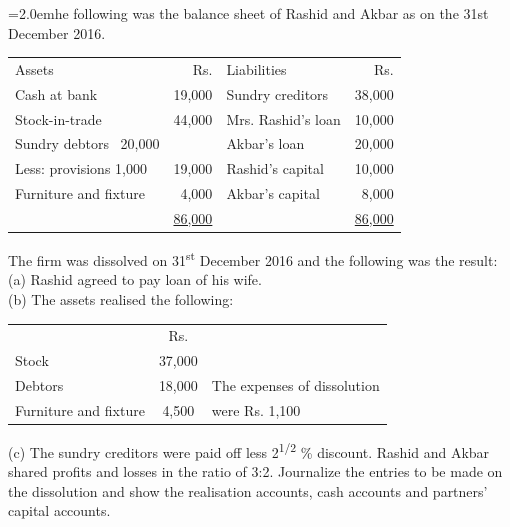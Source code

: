 \documentclass[11pt,a4paper]{article}
\newcommand{\lqn}[2]{\Needspace{6\baselineskip}\par\medskip\noindent\hangindent=2.0em\hangafter=1\makebox[2.0em][l]{\textbf{#1.}}#2\par}
\begin{document}
\lqn{107}{he following was the balance sheet of Rashid and Akbar as on the 31st December 2016.\par
\par\smallskip\noindent\hspace*{1.2em}\begin{tabular}{|lrlr|}
\hline
Assets & Rs. & Liabilities & Rs.\\
Cash at bank & 19,000 & Sundry creditors & 38,000\\
Stock-in-trade & 44,000 & Mrs. Rashid\textquoteright s loan & 10,000\\
Sundry debtors \ 20,000 & & Akbar\textquoteright s loan & 20,000\\
Less: provisions 1,000 & 19,000 & Rashid\textquoteright s capital & 10,000\\
Furniture and fixture & 4,000 & Akbar\textquoteright s capital & 8,000\\
 & \underline{86,000} & & \underline{86,000}\\
\hline
\end{tabular}\par\smallskip
The firm was dissolved on 31\textsuperscript{st}  December 2016 and the following was the result:\\
(a) Rashid agreed to pay loan of his wife.\\
(b) The assets realised the following:\par
\par\smallskip\noindent\hspace*{1.2em}\begin{tabular}{|lcl|}
\hline
 & Rs. &  \\
Stock & 37,000 &  \\
Debtors & 18,000 & The expenses of dissolution \\
Furniture and fixture & 4,500 & were Rs. 1,100 \\
\hline
\end{tabular}\par\smallskip
(c) The sundry creditors were paid off less 2\textsuperscript{1/2}  \% discount. Rashid and Akbar shared profits and losses in the ratio of 3:2. Journalize the entries to be made on the dissolution and show the realisation accounts, cash accounts and partners’ capital accounts.\par
}
\end{document}
